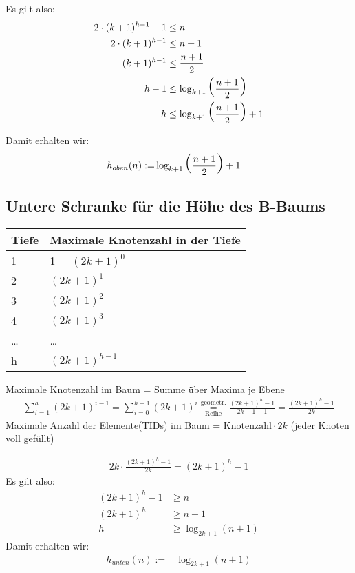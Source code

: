 \begin{solution}
Es gilt also:
\begin{align*}
2 \cdot (k + 1)^{h - 1} - 1 &\leq n\\
2 \cdot (k + 1)^{h - 1} &\leq n + 1\\
(k + 1)^{h - 1} &\leq \frac{n + 1}{2}\\
h - 1 &\leq \log_{k +1} \text{\huge{(}}\frac{n + 1}{2}\text{\huge{)}}\\
h &\leq \log_{k +1} \text{\huge{(}}\frac{n + 1}{2}\text{\huge{)}} + 1
\end{align*}

Damit erhalten wir:
\begin{align*}
h_{oben}(n):= & \log_{k +1} \text{\huge{(}}\frac{n + 1}{2}\text{\huge{)}} + 1
\end{align*}


\subsection*{Untere Schranke für die Höhe des B-Baums}
\begin{tabular}{p{2cm} p{8cm}}
	Tiefe			& Maximale Knotenzahl in der Tiefe	\\
	\hline
	1				& 1 = $(2k + 1)^0$ 							\\
	\hline
	2 				& $(2k+1)^1$ 										\\
	\hline
	3 				& $(2k+1)^2$ 										\\
	\hline
	4 				& $(2k+1)^3$ 										\\
	\hline
	\ldots		& \ldots												\\
	\hline
	h 				& $(2k+1)^{h-1}$ 								\\
	\hline
\end{tabular}

Maximale Knotenzahl im Baum =
Summe über Maxima je Ebene
\begin{align*}
\sum_{i = 1}^{h} (2k + 1)^{i - 1} = \sum_{i = 0}^{h - 1} (2k + 1)^{i} \overset{\text{geometr.}}{\underset{\text{Reihe}}{=}} \frac{(2k + 1)^h - 1}{2k + 1 - 1} = \frac{(2k + 1)^h - 1}{2k}
\end{align*}
Maximale Anzahl der Elemente(TIDs) im Baum =
$\mathrm{Knotenzahl} \cdot 2k$ (jeder Knoten voll gefüllt)

\begin{align*}
2k \cdot \frac{(2k + 1)^h - 1}{2k} = (2k + 1)^h - 1
\end{align*}
Es gilt also:
\begin{align*}
(2k + 1)^h - 1 &\geq n\\
(2k + 1)^h &\geq n + 1\\
h & \geq \log_{2k + 1} (n +1)
\end{align*}
Damit erhalten wir:
\begin{align*}
h_{unten}(n):=& \log_{2k + 1} (n +1)
\end{align*}
\end{solution}
